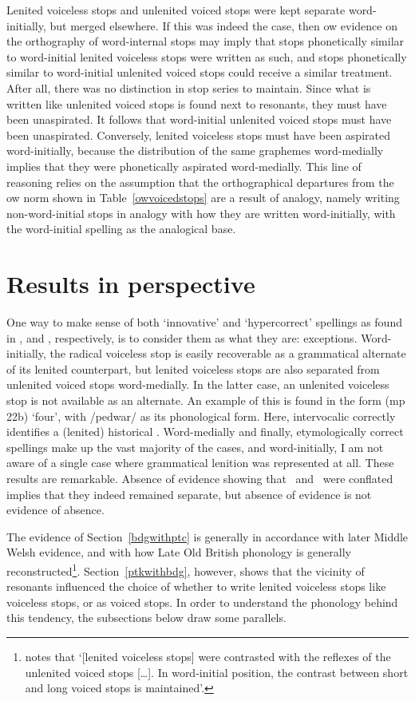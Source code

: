 Lenited voiceless stops and unlenited voiced stops were kept separate word-initially, but merged elsewhere. If this was indeed the case, then \gls{ow} evidence on the orthography of word-internal stops may imply that stops phonetically similar to word-initial lenited voiceless stops were written as such, and stops phonetically similar to word-initial unlenited voiced stops could receive a similar treatment. After all, there was no distinction in stop series to maintain. Since what is written like unlenited voiced stops is found next to resonants, they must have been unaspirated. It follows that word-initial unlenited voiced stops must have been unaspirated. Conversely, lenited voiceless stops must have been aspirated  word-initially, because the distribution of the same graphemes word-medially implies that they were phonetically aspirated word-medially. This line of reasoning relies on the assumption that the orthographical departures from the \gls{ow} norm shown in Table~\ref{owvoicedstops} are a result of analogy, namely writing non-word-initial stops in analogy with how they are written word-initially, with the word-initial spelling as the analogical base.

\section{Results in perspective}
One way to make sense of both `innovative' and `hypercorrect' spellings as found in , and , respectively, is to consider them as what they are: exceptions. Word-initially, the radical voiceless stop is easily recoverable as a grammatical alternate of its lenited counterpart, but lenited voiceless stops are also separated from unlenited voiced stops word-medially. In the latter case, an unlenited voiceless stop is not available as an alternate. An example of this is found in the form  (\gls{mp} 22b) `four', with /pedwar/ as its phonological form. Here, intervocalic  correctly identifies a (lenited) historical . Word-medially and finally, etymologically correct spellings make up the vast majority of the cases, and word-initially, I am not aware of a single case where grammatical lenition was represented at all. These results are remarkable. Absence of evidence showing that \xD\ and \lT\ were conflated implies that they indeed remained separate, but absence of evidence is not evidence of absence.

The evidence of Section~\ref{bdgwithptc} is generally in accordance with later Middle Welsh evidence, and with how Late Old British phonology is generally reconstructed\footnote{\Textcite[31]{schrijver_old_2011} notes that `[lenited voiceless stops] were contrasted with the reflexes of the unlenited voiced stops [\dots]. In word-initial position, the contrast between short and long voiced stops is maintained'.}. Section~\ref{ptkwithbdg}, however, shows that the vicinity of resonants influenced the choice of whether to write lenited voiceless stops like voiceless stops, or as voiced stops. In order to understand the phonology behind this tendency, the subsections below draw some parallels.
